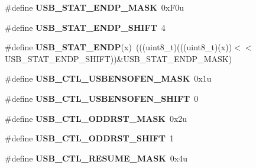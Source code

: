 \begin{DoxyCompactItemize}
\item 
\#define {\bfseries U\+S\+B\+\_\+\+S\+T\+A\+T\+\_\+\+E\+N\+D\+P\+\_\+\+M\+A\+SK}~0x\+F0u\hypertarget{group__USB__Register__Masks_gad8a184e838de511e23aa32011fc9f0b6}{}\label{group__USB__Register__Masks_gad8a184e838de511e23aa32011fc9f0b6}

\item 
\#define {\bfseries U\+S\+B\+\_\+\+S\+T\+A\+T\+\_\+\+E\+N\+D\+P\+\_\+\+S\+H\+I\+FT}~4\hypertarget{group__USB__Register__Masks_ga5d85a4b028002bc9ce0f1650111cd49a}{}\label{group__USB__Register__Masks_ga5d85a4b028002bc9ce0f1650111cd49a}

\item 
\#define {\bfseries U\+S\+B\+\_\+\+S\+T\+A\+T\+\_\+\+E\+N\+DP}(x)~(((uint8\+\_\+t)(((uint8\+\_\+t)(x))$<$$<$U\+S\+B\+\_\+\+S\+T\+A\+T\+\_\+\+E\+N\+D\+P\+\_\+\+S\+H\+I\+FT))\&U\+S\+B\+\_\+\+S\+T\+A\+T\+\_\+\+E\+N\+D\+P\+\_\+\+M\+A\+SK)\hypertarget{group__USB__Register__Masks_ga0302fe6637ae59174d7702947430dbba}{}\label{group__USB__Register__Masks_ga0302fe6637ae59174d7702947430dbba}

\item 
\#define {\bfseries U\+S\+B\+\_\+\+C\+T\+L\+\_\+\+U\+S\+B\+E\+N\+S\+O\+F\+E\+N\+\_\+\+M\+A\+SK}~0x1u\hypertarget{group__USB__Register__Masks_gaa406be72ac0b31143d3a3bc357af334b}{}\label{group__USB__Register__Masks_gaa406be72ac0b31143d3a3bc357af334b}

\item 
\#define {\bfseries U\+S\+B\+\_\+\+C\+T\+L\+\_\+\+U\+S\+B\+E\+N\+S\+O\+F\+E\+N\+\_\+\+S\+H\+I\+FT}~0\hypertarget{group__USB__Register__Masks_ga674ca18da1675b8ae48c65ca4203da36}{}\label{group__USB__Register__Masks_ga674ca18da1675b8ae48c65ca4203da36}

\item 
\#define {\bfseries U\+S\+B\+\_\+\+C\+T\+L\+\_\+\+O\+D\+D\+R\+S\+T\+\_\+\+M\+A\+SK}~0x2u\hypertarget{group__USB__Register__Masks_ga70907cc5c00bad68669ef02ec1332bfc}{}\label{group__USB__Register__Masks_ga70907cc5c00bad68669ef02ec1332bfc}

\item 
\#define {\bfseries U\+S\+B\+\_\+\+C\+T\+L\+\_\+\+O\+D\+D\+R\+S\+T\+\_\+\+S\+H\+I\+FT}~1\hypertarget{group__USB__Register__Masks_ga6e2ea6a3166748c567d22a767c69f98d}{}\label{group__USB__Register__Masks_ga6e2ea6a3166748c567d22a767c69f98d}

\item 
\#define {\bfseries U\+S\+B\+\_\+\+C\+T\+L\+\_\+\+R\+E\+S\+U\+M\+E\+\_\+\+M\+A\+SK}~0x4u\hypertarget{group__USB__Register__Masks_ga4e385fa5cf2157ef30a39c1c2b766cd3}{}\label{group__USB__Register__Masks_ga4e385fa5cf2157ef30a39c1c2b766cd3}


\end{DoxyCompactItemize}
